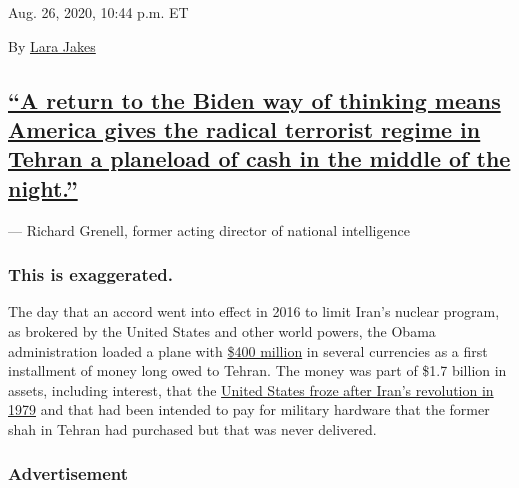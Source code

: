 Aug. 26, 2020, 10:44 p.m. ET

By \href{https://www.nytimes3xbfgragh.onion/by/lara-jakes}{Lara Jakes}

\hypertarget{a-return-to-the-biden-way-of-thinking-means-america-gives-the-radical-terrorist-regime-in-tehran-a-planeload-of-cash-in-the-middle-of-the-night}{%
\subsection{\texorpdfstring{\protect\hyperlink{a-return-to-the-biden-way-of-thinking-means-america-gives-the-radical-terrorist-regime-in-tehran-a-planeload-of-cash-in-the-midd}{``A
return to the Biden way of thinking means America gives the radical
terrorist regime in Tehran a planeload of cash in the middle of the
night.''}}{``A return to the Biden way of thinking means America gives the radical terrorist regime in Tehran a planeload of cash in the middle of the night.''}}\label{a-return-to-the-biden-way-of-thinking-means-america-gives-the-radical-terrorist-regime-in-tehran-a-planeload-of-cash-in-the-middle-of-the-night}}

--- Richard Grenell, former acting director of national intelligence

\hypertarget{this-is-exaggerated-1}{%
\subsubsection{This is exaggerated.}\label{this-is-exaggerated-1}}

The day that an accord went into effect in 2016 to limit Iran's nuclear
program, as brokered by the United States and other world powers, the
Obama administration loaded a plane with
\href{https://slack-redir.net/link?url=https\%3A\%2F\%2Fwww.cnn.com\%2F2016\%2F08\%2F03\%2Fpolitics\%2Fus-sends-plane-iran-400-million-cash\%2Findex.html}{\$400
million} in several currencies as a first installment of money long owed
to Tehran. The money was part of \$1.7 billion in assets, including
interest, that the
\href{https://slack-redir.net/link?url=https\%3A\%2F\%2Fwww.nytimes3xbfgragh.onion\%2F2016\%2F08\%2F23\%2Fopinion\%2Fthe-fake-400-million-iran-ransom-story.html}{United
States froze after Iran's revolution in 1979} and that had been intended
to pay for military hardware that the former shah in Tehran had
purchased but that was never delivered.

\hypertarget{advertisement-5}{%
\subsubsection{Advertisement}\label{advertisement-5}}

